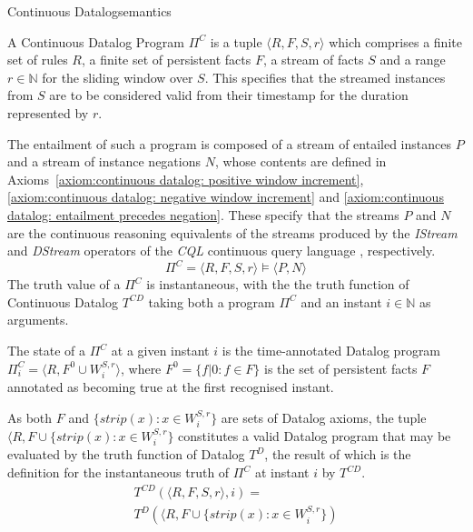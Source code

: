 \begin{nestedsection}{Continuous Datalog}{semantics}
\begin{definition}\label{def:continuous datalog: CDP}
A Continuous Datalog Program $\Pi^C$ is a tuple $\langle R, F, S, r
\rangle$ which comprises a finite set of rules $R$, a finite set of persistent
facts $F$, a stream of facts $S$ and a range $r \in \mathbb{N}$ for
the sliding window over $S$. This specifies that the streamed instances from $S$ are
to be considered valid from their timestamp for the duration represented
by $r$.

The entailment of such a program is composed of a stream of entailed
instances $P$ and a stream of instance negations $N$, whose contents
are defined in 
Axioms~\ref{axiom:continuous datalog: positive window increment}, 
\ref{axiom:continuous datalog: negative window increment} and
\ref{axiom:continuous datalog: entailment precedes negation}. 
These specify that the streams $P$ and $N$ are the continuous
reasoning equivalents of the streams produced by the \emph{IStream}
and \emph{DStream} operators of the \emph{CQL} continuous query
language \citep{CQL}, respectively.
\[ \Pi^C = \langle R, F, S, r \rangle \vDash \langle P, N \rangle \]
The truth value of a $\Pi^C$ is instantaneous, with the the truth
function of Continuous Datalog $T^{CD}$ taking both a program ${\Pi^C}$
and an instant ${i \in \mathbb{N}}$ as arguments.
\end{definition}

\begin{definition}[State of a $\Pi^C$]\label{def:continuous datalog: CDPt}
The state of a $\Pi^C$ at a given instant $i$ is the time-annotated
Datalog program ${\Pi^C_i = \langle R, F^0 \cup W^{S,r}_{i} \rangle}$,
where ${F^0 = \{ f | 0 : f \in F \}}$ is the set of persistent facts $F$
annotated as becoming true at the first recognised instant.

As both $F$ and ${\{ strip(x) : x \in W^{S,r}_{i} \}}$ are sets of Datalog
axioms, the tuple ${\langle R, F \cup \{ strip(x) : x \in W^{S,r}_{i} \}}$
constitutes a valid Datalog program that may be evaluated by the truth
function of Datalog $T^{D}$, the result of which is the definition for the
instantaneous truth of $\Pi^C$ at instant $i$ by $T^{CD}$.
\begin{multline*}
T^{CD} \left( \langle R, F, S, r \rangle, i \right) = \\
	T^{D} \left( \langle R, F \cup \{ strip(x) : x \in W^{S,r}_{i} \} \right)
\end{multline*}


\end{definition}
\end{nestedsection}
